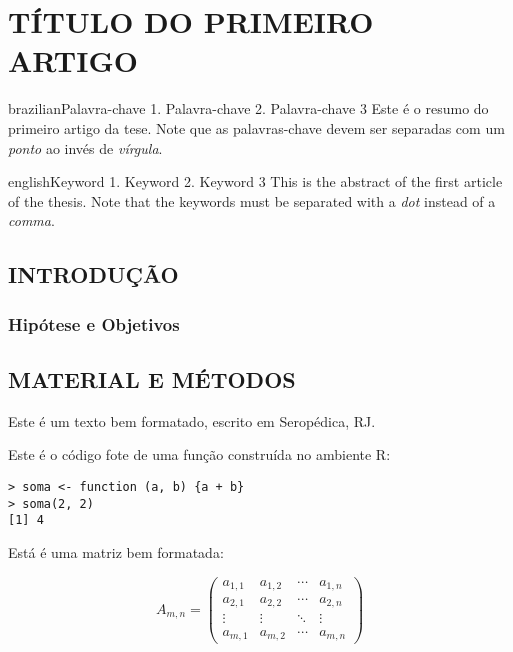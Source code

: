 \artigotrue
\chapter{TÍTULO DO PRIMEIRO ARTIGO}
\label{chap:chapter01}

\begin{chapterabstract}{brazilian}{Palavra-chave 1. Palavra-chave 2. Palavra-chave 3}
Este é o resumo do primeiro artigo da tese. Note que as palavras-chave devem ser separadas com um \emph{ponto} 
ao invés de \emph{vírgula}.
\end{chapterabstract}

\begin{chapterabstract}{english}{Keyword 1. Keyword 2. Keyword 3}
This is the abstract of the first article of the thesis. Note that the keywords must be separated with a 
\emph{dot} instead of a \emph{comma}.
\end{chapterabstract}

\formatchapter

\section{INTRODUÇÃO}

\blindtext[2]

\subsection{Hipótese e Objetivos}

\blindtext[2]

\section{MATERIAL E MÉTODOS}

Este é um texto bem formatado, escrito em Seropédica, RJ. \blindtext[1]

Este é o código fote de uma função construída no ambiente R:

\begin{verbatim}
> soma <- function (a, b) {a + b}
> soma(2, 2)
[1] 4
\end{verbatim}

Está é uma matriz bem formatada:

\begin{equation}
  A_{m,n} =
 \begin{pmatrix}
  a_{1,1} & a_{1,2} & \cdots & a_{1,n} \\
  a_{2,1} & a_{2,2} & \cdots & a_{2,n} \\
  \vdots  & \vdots  & \ddots & \vdots  \\
  a_{m,1} & a_{m,2} & \cdots & a_{m,n}
 \end{pmatrix}
\end{equation}

